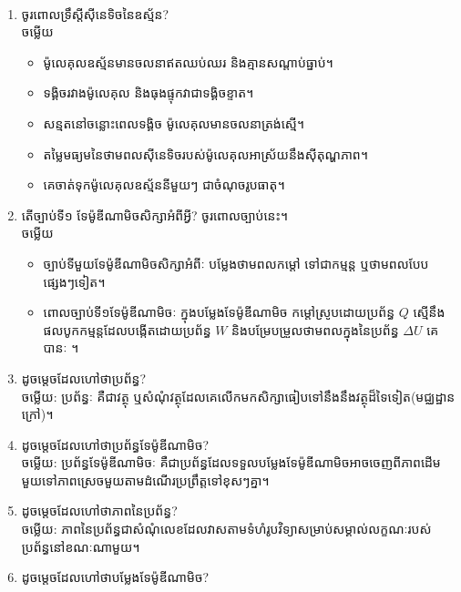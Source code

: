 \documentclass{officialexam}
\begin{document}
	\maketitle\\
	\begin{enumerate}[m]
		\item ចូរពោលទ្រឹស្តីសុីនេទិចនៃឧស្ម័ន?\\
		{\color{red}\sffamily ចម្លើយ}
		\begin{itemize}
			\item ម៉ូលេគុលឧស្ម័នមានចលនាឥតឈប់ឈរ និងគ្មានសណ្តាប់ធ្នាប់។
			\item ទង្គិចរវាងម៉ូលេគុល និងធុងផ្ទុកវាជាទង្គិចខ្ទាត។
			\item សន្មតនៅចន្លោះពេលទង្គិច ម៉ូលេគុលមានចលនាត្រង់ស្មើ។
			\item តម្លៃមធ្យមនៃថាមពលសុីនេទិចរបស់ម៉ូលេគុលអាស្រ័យនឹងសុីតុណ្ហភាព។
			\item គេចាត់ទុកម៉ូលេគុលឧស្ម័ននីមួយៗ ជាចំណុចរូបធាតុ។
		\end{itemize}
		\item តើច្បាប់ទី១ ទែម៉ូឌីណាមិចសិក្សាអំពីអ្វី? ចូរពោលច្បាប់នេះ។\\
		{\color{red}\sffamily ចម្លើយ}
		\begin{itemize}
			\item ច្បាប់ទីមួយទែម៉ូឌីណាមិចសិក្សាអំពីៈ បម្លែងថាមពលកម្តៅ ទៅជាកម្មន្ត ឬថាមពលបែបផ្សេងៗទៀត។
			\item ពោលច្បាប់ទី១ទែម៉ូឌីណាមិចៈ ក្នុងបម្លែងទែម៉ូឌីណាមិច កម្តៅស្រូបដោយប្រព័ន្ធ $Q$ ស្មើនឹងផលបូកកម្មន្តដែលបង្កើតដោយប្រព័ន្ធ $W$ និងបម្រែបម្រួលថាមពលក្នុងនៃប្រព័ន្ធ $\Delta U$ គេបានៈ ។
		\end{itemize}
		\item ដូចម្តេចដែលហៅថាប្រព័ន្ធ?\\
		{\color{red}\sffamily ចម្លើយ}: ប្រព័ន្ធៈ គឺជាវត្ថុ ឬសំណុំវត្ថុដែលគេលើកមកសិក្សាធៀបទៅនឹងនឹងវត្ថុដ៏ទៃទៀត(មជ្ឈដ្ឋានក្រៅ)។
		\item ដូចម្តេចដែលហៅថាប្រព័ន្ធទែម៉ូឌីណាមិច?\\
		{\color{red}\sffamily ចម្លើយ}: ប្រព័ន្ធទែម៉ូឌីណាមិចៈ គឺជាប្រព័ន្ធដែលទទួលបម្លែងទែម៉ូឌីណាមិចអាចចេញពីភាពដើមមួយទៅភាពស្រេចមួយតាមដំណើរប្រព្រឹត្តទៅខុសៗគ្នា។
		\item ដូចម្តេចដែលហៅថាភាពនៃប្រព័ន្ធ?\\
		{\color{red}\sffamily ចម្លើយ}: ភាពនៃប្រព័ន្ធជាសំណុំលេខដែលវាសតាមទំហំរូបវិទ្យាសម្រាប់សម្គាល់លក្ខណៈរបស់ប្រព័ន្ធនៅខណៈណាមួយ។
		\item ដូចម្តេចដែលហៅថាបម្លែងទែម៉ូឌីណាមិច?\\

\end{enumerate}
\end{document}
